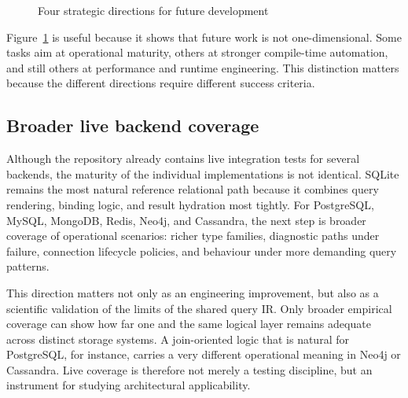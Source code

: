 \begin{figure}[H]
\centering
{}
\caption{Four strategic directions for future development}
\label{fig:future_work_axes}
\end{figure}

Figure~\ref{fig:future_work_axes} is useful because it shows that future work is not one-dimensional. Some tasks aim at operational maturity, others at stronger compile-time automation, and still others at performance and runtime engineering. This distinction matters because the different directions require different success criteria.

\subsection{Broader live backend coverage}

Although the repository already contains live integration tests for several backends, the maturity of the individual implementations is not identical. SQLite remains the most natural reference relational path because it combines query rendering, binding logic, and result hydration most tightly. For PostgreSQL, MySQL, MongoDB, Redis, Neo4j, and Cassandra, the next step is broader coverage of operational scenarios: richer type families, diagnostic paths under failure, connection lifecycle policies, and behaviour under more demanding query patterns.

This direction matters not only as an engineering improvement, but also as a scientific validation of the limits of the shared query IR. Only broader empirical coverage can show how far one and the same logical layer remains adequate across distinct storage systems. A join-oriented logic that is natural for PostgreSQL, for instance, carries a very different operational meaning in Neo4j or Cassandra. Live coverage is therefore not merely a testing discipline, but an instrument for studying architectural applicability.

